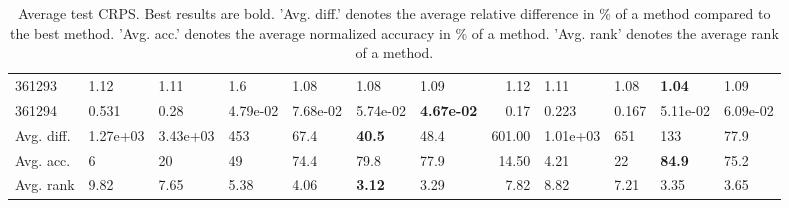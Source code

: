 \begin{table}[ht!]
\begin{tabular}{lllllllrllll}
  361293 & 1.12 & 1.11 & 1.6 & 1.08 & 1.08 & 1.09 & 1.12 & 1.11 & 1.08 & \textbf{1.04} & 1.09 \\ 
  361294 & 0.531 & 0.28 & 4.79e-02 & 7.68e-02 & 5.74e-02 & \textbf{4.67e-02} & 0.17 & 0.223 & 0.167 & 5.11e-02 & 6.09e-02 \\ 
   \hline
Avg. diff. & 1.27e+03 & 3.43e+03 & 453 & 67.4 & \textbf{40.5} & 48.4 & 601.00 & 1.01e+03 & 651 & 133 & 77.9 \\ 
  Avg. acc. & 6 & 20 & 49 & 74.4 & 79.8 & 77.9 & 14.50 & 4.21 & 22 & \textbf{84.9} & 75.2 \\ 
  Avg. rank & 9.82 & 7.65 & 5.38 & 4.06 & \textbf{3.12} & 3.29 & 7.82 & 8.82 & 7.21 & 3.35 & 3.65 \\ 
   \hline
\hline
\end{tabular}
\endgroup
\caption{Average test CRPS. 
                  Best results are bold. 
                  'Avg. diff.' denotes the average relative difference in \% of a method compared to the best method.
                  'Avg. acc.' denotes the average normalized accuracy in \% of a method.
                  'Avg. rank' denotes the average rank of a method.} 
\label{TABLES/table_results_CRPS_umap}
\end{table}
